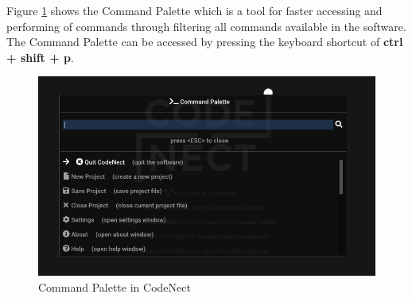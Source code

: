 \parx
Figure \ref{fig:cn_command_palette} shows the Command Palette which is a tool
for faster accessing and performing of commands through filtering all commands
available in the software. The Command Palette can be accessed by pressing the keyboard
shortcut of \textbf{ctrl + shift + p}.

\begin{figure}[H]
	\centering
	\captionsetup{justification=centering}
	\captionsetup[figure]{list=yes}
	\includegraphics[width=\linewidth]{media/sc_command_palette.png}
	\caption[Command Palette in CodeNect]{Command Palette in CodeNect}
	\label{fig:cn_command_palette}
\end{figure}

